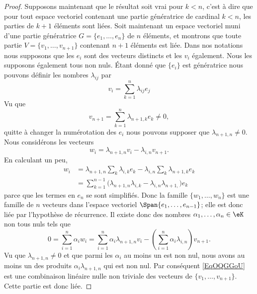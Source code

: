 \begin{proof}
    Supposons maintenant que le résultat soit vrai pour \( k<n\), c'est à dire que pour tout espace vectoriel contenant une partie génératrice de cardinal \( k<n\), les parties de \( k+1\) éléments sont liées. Soit maintenant un espace vectoriel muni d'une partie génératrice \( G=\{ e_1,\ldots, e_n \}\) de \( n\) éléments, et montrons que toute partie \( V=\{ v_1,\ldots, v_{n+1} \}\) contenant \( n+1\) éléments est liée. Dans nos notations nous supposons que les \( e_i\) sont des vecteurs distincts et les \( v_i\) également. Nous les supposons également tous non nuls. Étant donné que \( \{ e_i \}\) est génératrice nous pouvons définir les nombres \( \lambda_{ij}\) par
    \begin{equation}
        v_i=\sum_{k=1}^n\lambda_{ij}e_j
    \end{equation}
    Vu que
    \begin{equation}
        v_{n+1}=\sum_{k=1}^n\lambda_{n+1,k}e_k\neq 0,
    \end{equation}
    quitte à changer la numérotation des \( e_i\) nous pouvons supposer que \( \lambda_{n+1,n}\neq 0\). Nous considérons les vecteurs
    \begin{equation}
        w_i=\lambda_{n+1,n}v_i-\lambda_{i,n}v_{n+1}.
    \end{equation}
    En calculant un peu,
    \begin{subequations}
        \begin{align}
            w_i&=\lambda_{n+1,n}\sum_k\lambda_{i,k}e_k-\lambda_{i,n}\sum_k\lambda_{n+1,k}e_k\\
            &=\sum_{k=1}^{n-1}\big( \lambda_{n+1,n}\lambda_{i,k}-\lambda_{i,n}\lambda_{n+1,} \big)e_k
        \end{align}
    \end{subequations}
    parce que les termes en \( e_n\) se sont simplifiés. Donc la famille \( \{ w_1,\ldots, w_n \}\) est une famille de \( n\) vecteurs dans l'espace vectoriel \( \Span\{ e_1,\ldots, e_{n-1} \}\); elle est donc liée par l'hypothèse de récurrence. Il existe donc des nombres \( \alpha_1,\ldots, \alpha_n\in \eK\) non tous nuls tels que
    \begin{equation}        \label{EqOQGGoU}
        0=\sum_{i=1}^n\alpha_iw_i=\sum_{i=1}^n\alpha_i\lambda_{n+1,n}v_i-\left( \sum_{i=1}^n\alpha_i\lambda_{i,n} \right)v_{n+1}.
    \end{equation}
    Vu que \( \lambda_{n+1,n}\neq 0\) et que parmi les \( \alpha_i\) au moins un est non nul, nous avons au moins un des produits \( \alpha_i\lambda_{n+1,n}\) qui est non nul. Par conséquent \eqref{EqOQGGoU} est une combinaison linéaire nulle non triviale des vecteurs de \( \{ v_1,\ldots, v_{n+1} \}\). Cette partie est donc liée.
\end{proof}

